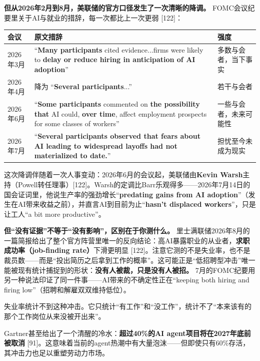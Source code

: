 \documentclass[11pt,a4paper]{ctexart}
\begin{document}
\textbf{但从2026年2月到8月，美联储的官方口径发生了一次清晰的降调。} FOMC会议纪要里关于AI与就业的措辞，每一次都比上一次更弱 [122]：

\begin{center}

\begin{tabularx}{\textwidth}{lXX}
\toprule
会议 & 原文措辞 & 强度 \\
\midrule
2026年3月 & “\textbf{Many participants} cited evidence...firms were likely to \textbf{delay or reduce hiring in anticipation of AI adoption}” & 多数与会者，当下事实 \\
2026年4月 & 降为 “\textbf{Several participants}...” & 若干与会者 \\
2026年6月 & “\textbf{Some participants} commented on \textbf{the possibility that} AI could, \textbf{over time}, affect employment prospects for some classes of workers” & 一些与会者，未来可能性 \\
2026年7月 & “\textbf{Several participants observed that fears about AI leading to widespread layoffs had not materialized to date.}” & 担忧至今未成为现实 \\
\bottomrule
\end{tabularx}
\end{center}

这次降调伴随着一次人事变动：2026年6月的会议起，美联储由\textbf{Kevin Warsh}主持（Powell转任理事）[122]。Warsh的定调比Barr乐观得多——2026年7月14日的国会证词里，他说生产率的强劲增长“\textbf{predating gains from AI adoption}”（发生在AI带来收益之前），并直言AI到目前为止“\textbf{hasn't displaced workers}”，只是让工人“a bit more productive”。

\textbf{但“没有证据”不等于“没有影响”，区别在于你测什么。} 里士满联储2026年8月的一篇简报给出了整个官方阵营里唯一的反向结论：高AI暴露职业的从业者，\textbf{求职成功率（job-finding rate）}下滑更明显 [122]。注意它测的不是失业率，也不是裁员数——而是“投出简历之后拿到工作的概率”。这可能正是“低招聘型冲击”唯一能被现有统计捕捉到的形状：\textbf{没有人被裁，只是没有人被招。} 7月的FOMC纪要用另一种说法印证了同一件事——AI带来的不确定性正在“keeping both hiring and firing low”（招聘和解雇双双维持低位）。

失业率统计不到这种冲击。它只统计“有工作”和“没工作”，统计不了“本来该有的那个工作岗位从来没被开出来”。

Gartner甚至给出了一个清醒的冷水：\textbf{超过40\%的AI agent项目将在2027年底前被取消}{} [91]。这意味着当前的agent热潮中有大量泡沫——但即使只有60\%存活，其冲击力也足以重塑劳动力市场。
\end{document}
